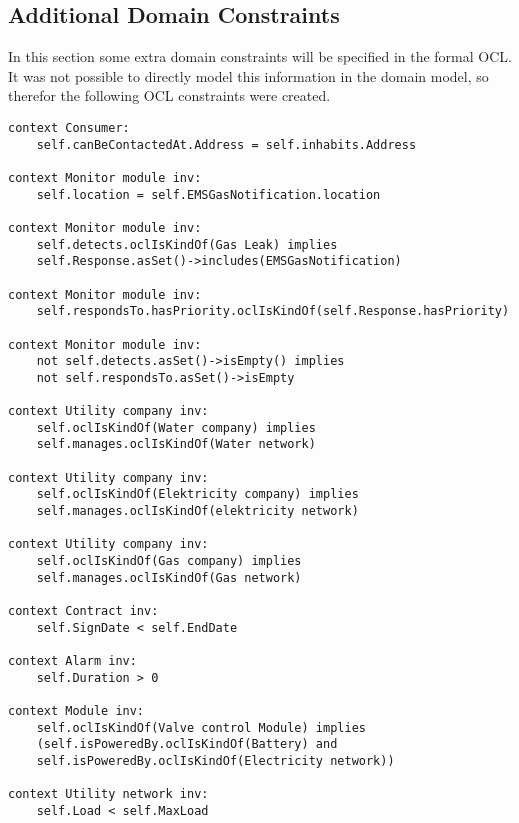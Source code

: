 \subsection{Additional Domain Constraints}
In this section some extra domain constraints will be specified in the formal OCL. It was not possible to directly model this information in the domain model, so therefor the following OCL constraints were created.
\begin{lstlisting}
context	Consumer: 
	self.canBeContactedAt.Address = self.inhabits.Address

context Monitor module inv:
	self.location = self.EMSGasNotification.location

context	Monitor module inv:
	self.detects.oclIsKindOf(Gas Leak) implies 
	self.Response.asSet()->includes(EMSGasNotification)

context Monitor module inv:
	self.respondsTo.hasPriority.oclIsKindOf(self.Response.hasPriority)

context Monitor module inv:
	not self.detects.asSet()->isEmpty() implies
	not self.respondsTo.asSet()->isEmpty

context Utility company inv:
	self.oclIsKindOf(Water company) implies 
	self.manages.oclIsKindOf(Water network)

context Utility company inv:
	self.oclIsKindOf(Elektricity company) implies 
	self.manages.oclIsKindOf(elektricity network)

context Utility company inv:
	self.oclIsKindOf(Gas company) implies 
	self.manages.oclIsKindOf(Gas network)

context Contract inv:
	self.SignDate < self.EndDate

context Alarm inv: 
	self.Duration > 0

context Module inv:
	self.oclIsKindOf(Valve control Module) implies
	(self.isPoweredBy.oclIsKindOf(Battery) and 
	self.isPoweredBy.oclIsKindOf(Electricity network))
	
context Utility network inv: 
	self.Load < self.MaxLoad

\end{lstlisting}

